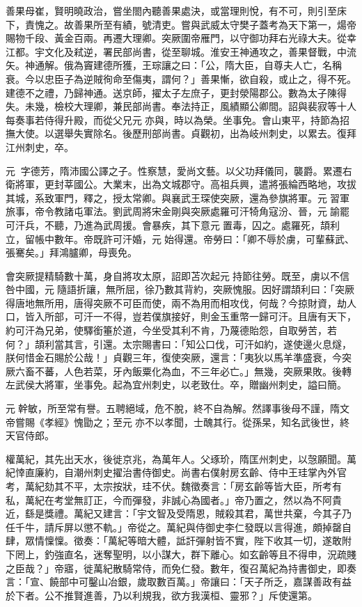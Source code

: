 \begin{pinyinscope}
 善果母崔，賢明曉政治，嘗坐閤內聽善果處決，或當理則悅，有不可，則引至床下，責愧之。故善果所至有績，號清吏。嘗與武威太守樊子蓋考為天下第一，煬帝賜物千段、黃金百兩。再遷大理卿。突厥圍帝雁門，以守御功拜右光祿大夫。從幸江都。宇文化及弒逆，署民部尚書，從至聊城。淮安王神通攻之，善果督戰，中流矢。神通解。俄為竇建德所獲，王琮讓之曰：「公，隋大臣，自尊夫人亡，名稱衰。今以忠臣子為逆賊徇命至傷夷，謂何？」善果慚，欲自殺，或止之，得不死。建德不之禮，乃歸神通。送京師，擢太子左庶子，更封滎陽郡公。數為太子陳得失。未幾，檢校大理卿，兼民部尚書。奉法持正，風績顯公卿間。詔與裴寂等十人每奏事若侍得升殿，而從父兄元亦與，時以為榮。坐事免。會山東平，持節為招撫大使。以選舉失實除名。後歷刑部尚書。貞觀初，出為岐州刺史，以累去。復拜江州刺史，卒。



 元，字德芳，隋沛國公譯之子。性察慧，愛尚文藝。以父功拜儀同，襲爵。累遷右衛將軍，更封莘國公。大業末，出為文城郡守。高祖兵興，遣將張綸西略地，攻拔其城，系致軍門，釋之，授太常卿。與襄武王琛使突厥，還為參旗將軍。元習軍旅事，帝令教諸屯軍法。劉武周將宋金剛與突厥處羅可汗犄角寇汾、晉，元諭罷可汗兵，不聽，乃進為武周援。會暴疾，其下意元置毒，囚之。處羅死，頡利立，留帳中數年。帝既許可汗婚，元始得還。帝勞曰：「卿不辱於虜，可輩蘇武、張騫矣。」拜鴻臚卿，母喪免。



 會突厥提精騎數十萬，身自將攻太原，詔即苫次起元持節往勞。既至，虜以不信咎中國，元隨語折讓，無所屈，徐乃數其背約，突厥愧服。因好謂頡利曰：「突厥得唐地無所用，唐得突厥不可臣而使，兩不為用而相攻伐，何哉？今掠財資，劫人口，皆入所部，可汗一不得，豈若僕旗接好，則金玉重幣一歸可汗。且唐有天下，約可汗為兄弟，使驛銜箠於道，今坐受其利不肯，乃蔑德貽怨，自取勞苦，若何？」頡利當其言，引還。太宗賜書曰：「知公口伐，可汗如約，遂使邊火息燧，朕何惜金石賜於公哉！」貞觀三年，復使突厥，還言：「夷狄以馬羊準盛衰，今突厥六畜不蕃，人色若菜，牙內飯粟化為血，不三年必亡。」無幾，突厥果敗。後轉左武侯大將軍，坐事免。起為宜州刺史，以老致仕。卒，贈幽州刺史，謚曰簡。



 元幹敏，所至常有譽。五聘絕域，危不脫，終不自為解。然譯事後母不謹，隋文帝嘗賜《孝經》愧勖之；至元亦不以孝聞，士醜其行。從孫杲，知名武後世，終天官侍郎。



 權萬紀，其先出天水，後徙京兆，為萬年人。父琢玠，隋匡州刺史，以愨願聞。萬紀悻直廉約，自潮州刺史擢治書侍御史。尚書右僕射房玄齡、侍中王珪掌內外官考，萬紀劾其不平，太宗按狀，珪不伏。魏徵奏言：「房玄齡等皆大臣，所考有私，萬紀在考堂無訂正，今而彈發，非誠心為國者。」帝乃置之，然以為不阿貴近，繇是獎禮。萬紀又建言：「宇文智及受隋恩，賊殺其君，萬世共棄，今其子乃任千牛，請斥屏以懲不軌。」帝從之。萬紀與侍御史李仁發既以言得進，頗掉罄自肆，眾情懍懍。徵奏：「萬紀等暗大體，詆訐彈射皆不實，陛下收其一切，遂敢附下罔上，釣強直名，迷奪聖明，以小謀大，群下離心。如玄齡等且不得申，況疏賤之臣哉？」帝寤，徙萬紀散騎常侍，而免仁發。數年，復召萬紀為持書御史，即奏言：「宣、饒部中可鑿山冶銀，歲取數百萬。」帝讓曰：「天子所乏，嘉謀善政有益於下者。公不推賢進善，乃以利規我，欲方我漢桓、靈邪？」斥使還第。




\end{pinyinscope}
